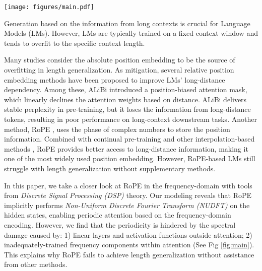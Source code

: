\begin{figure*}[t]
    \centering
    \texttt{[image: figures/main.pdf]}
    \caption{The reasons why RoPE’s periodic extension deteriorates and how FoPE addresses these issues to improve length generalization. (a) As signals pass through linear and nonlinear transformations, this causes spectral leakage and distortion, mixing multiple frequencies into a single dimension. Under RoPE, each dimension is treated as a single-frequency component. By contrast, FoPE models each dimension as a Fourier series of different frequency components, thereby separating information more effectively and mitigating spectral damage. (b) FoPE eliminates inadequately trained frequency components, which are harmful for periodic extension. By preserving only the zero-frequency component, FoPE safeguards periodic extension and delivers more robust length generalization.}
    \label{fig:main}
\end{figure*}

Generation based on the information from long contexts is crucial for Language Models (LMs). However, LMs are typically trained on a fixed context window \citep{vaswani2017attention, touvron2023llama, groeneveld2024olmo} and tends to overfit to the specific context length.

Many studies consider the absolute position embedding \citep{vaswani2017attention} to be the source of overfitting in length generalization.
As mitigation, several relative position embedding methods have been proposed \citep{press2021train, su2024roformer, peng2023yarn, jin2024llm} to improve LMs' long-distance dependency.
Among these, ALiBi \citep{press2021train} introduced a position-biased attention mask, which linearly declines the attention weights based on distance. ALiBi delivers stable perplexity in pre-training, but it loses the information from long-distance tokens, resulting in poor performance on long-context downstream tasks.
Another method, RoPE \citep{su2024roformer}, uses the phase of complex numbers to store the position information. Combined with continual pre-training and other interpolation-based methods \citep{peng2023yarn,xiong-etal-2024-effective,chen2024clex,jin2024llm}, RoPE provides better access to long-distance information, making it one of the most widely used position embedding. 
However, RoPE-based LMs still struggle with length generalization without supplementary methods. 

In this paper, we take a closer look at RoPE in the frequency-domain with tools from \textit{Discrete Signal Processing (DSP)} theory.
Our modeling reveals that RoPE implicitly performs \textit{Non-Uniform Discrete Fourier Transform (NUDFT)} on the hidden states, enabling periodic attention based on the frequency-domain encoding.
However, we find that the periodicity is hindered by the spectral damage caused by: 1) linear layers and activation functions outside attention; 2) inadequately-trained frequency components within attention (See Fig \ref{fig:main}). This explains why RoPE fails to achieve length generalization without assistance from other methods. 

